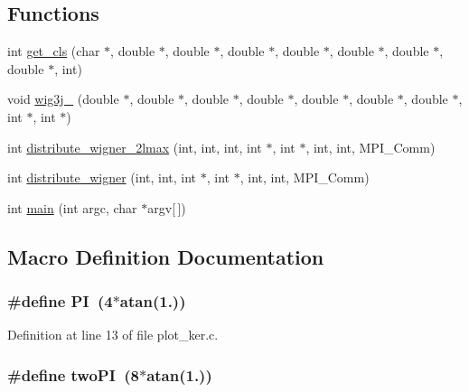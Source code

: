 \subsection*{Functions}
\begin{DoxyCompactItemize}
\item 
int \hyperlink{plot__ker_8c_acd0142ec39047291acf248c48b0a28f4}{get\-\_\-cls} (char $\ast$, double $\ast$, double $\ast$, double $\ast$, double $\ast$, double $\ast$, double $\ast$, double $\ast$, int)
\item 
void \hyperlink{plot__ker_8c_af06278380393e21ff3f1bf4db83834b4}{wig3j\-\_\-} (double $\ast$, double $\ast$, double $\ast$, double $\ast$, double $\ast$, double $\ast$, double $\ast$, int $\ast$, int $\ast$)
\item 
int \hyperlink{plot__ker_8c_a89f27ccc4509d2e1e33dd4ce95f9db0c}{distribute\-\_\-wigner\-\_\-2lmax} (int, int, int, int $\ast$, int $\ast$, int, int, M\-P\-I\-\_\-\-Comm)
\item 
int \hyperlink{plot__ker_8c_aea159557fbdfdb49fa220df8dab8b425}{distribute\-\_\-wigner} (int, int, int $\ast$, int $\ast$, int, int, M\-P\-I\-\_\-\-Comm)
\item 
int \hyperlink{plot__ker_8c_a0ddf1224851353fc92bfbff6f499fa97}{main} (int argc, char $\ast$argv\mbox{[}$\,$\mbox{]})
\end{DoxyCompactItemize}


\subsection{Macro Definition Documentation}
\subsubsection[{P\-I}]{\setlength{\rightskip}{0pt plus 5cm}\#define P\-I~(4$\ast$atan(1.))}\label{plot__ker_8c_a598a3330b3c21701223ee0ca14316eca}


Definition at line 13 of file plot\-\_\-ker.\-c.

\subsubsection[{two\-P\-I}]{\setlength{\rightskip}{0pt plus 5cm}\#define two\-P\-I~(8$\ast$atan(1.))}\label{plot__ker_8c_a0a3527f8b23535fe43972fbe88c3cc0d}


